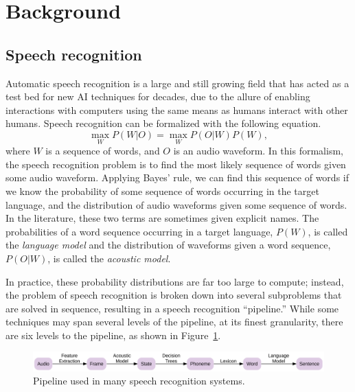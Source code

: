 \documentclass{article}
\begin{document}
\section{Background}
\label{sec:background}

\subsection{Speech recognition}
\label{subsec:recognition}

Automatic speech recognition
is a large and still growing field
that has acted as a test bed
for new AI techniques for decades,
due to the allure of enabling
interactions with computers
using the same means
as humans interact with other humans.
Speech recognition can be formalized
with the following equation.
\begin{equation}
  \max_W P(W|O) = \max_W P(O|W) P(W),
\end{equation}
where $W$ is a sequence of words,
and $O$ is an audio waveform.
In this formalism, the speech recognition problem
is to find the most likely sequence of words
given some audio waveform.
Applying Bayes' rule, we can find
this sequence of words
if we know the probability
of some sequence of words occurring
in the target language,
and the distribution of audio waveforms
given some sequence of words.
In the literature, these two terms
are sometimes given explicit names.
The probabilities of a word sequence
occurring in a target language,
$P(W)$, is called the \textit{language model}
and the distribution of waveforms
given a word sequence, $P(O|W)$,
is called the \textit{acoustic model}.

In practice, these probability distributions
are far too large to compute;
instead, the problem of speech recognition
is broken down into several subproblems
that are solved in sequence,
resulting in a speech recognition ``pipeline.''
While some techniques may span several levels
of the pipeline, at its finest granularity,
there are six levels to the pipeline,
as shown in Figure~\ref{fig:recognition}.

\begin{figure}
  \begin{center}
    \includegraphics[width=1.0\linewidth]{recognition}
  \end{center}
  \caption{Pipeline used in many speech recognition systems.}
  \label{fig:recognition}
\end{figure}
\end{document}
